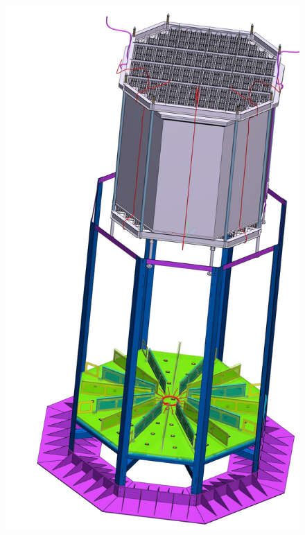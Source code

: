 \begin{figure}[!t]
\includegraphics[height=0.4\textheight]{./Figures/Veto-Assembly_new.jpg}

\end{figure}
